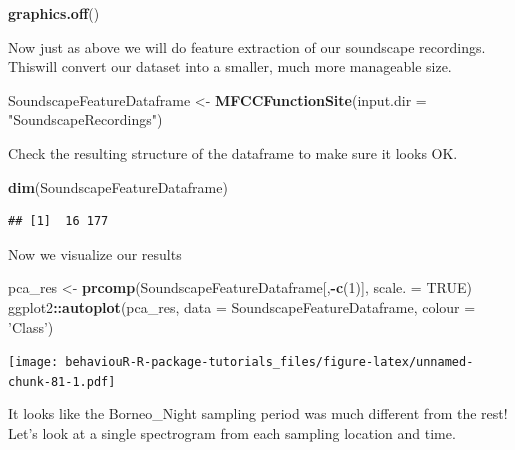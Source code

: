 \documentclass[]{book}
\newenvironment{Shaded}{\begin{snugshade}}{\end{snugshade}}
\newcommand{\DataTypeTok}[1]{\textcolor[rgb]{0.13,0.29,0.53}{#1}}
\newcommand{\DecValTok}[1]{\textcolor[rgb]{0.00,0.00,0.81}{#1}}
\newcommand{\KeywordTok}[1]{\textcolor[rgb]{0.13,0.29,0.53}{\textbf{#1}}}
\newcommand{\NormalTok}[1]{#1}
\newcommand{\OperatorTok}[1]{\textcolor[rgb]{0.81,0.36,0.00}{\textbf{#1}}}
\newcommand{\OtherTok}[1]{\textcolor[rgb]{0.56,0.35,0.01}{#1}}
\newcommand{\StringTok}[1]{\textcolor[rgb]{0.31,0.60,0.02}{#1}}
\begin{document}
\begin{Shaded}
\begin{Highlighting}[]
\KeywordTok{graphics.off}\NormalTok{()}
\end{Highlighting}
\end{Shaded}

Now just as above we will do feature extraction of our soundscape recordings. Thiswill convert our dataset into a smaller, much more manageable size.

\begin{Shaded}
\begin{Highlighting}[]
\NormalTok{SoundscapeFeatureDataframe <-}\StringTok{ }
\StringTok{  }\KeywordTok{MFCCFunctionSite}\NormalTok{(}\DataTypeTok{input.dir =} \StringTok{"SoundscapeRecordings"}\NormalTok{)}
\end{Highlighting}
\end{Shaded}

Check the resulting structure of the dataframe to make sure it looks OK.

\begin{Shaded}
\begin{Highlighting}[]
\KeywordTok{dim}\NormalTok{(SoundscapeFeatureDataframe)}
\end{Highlighting}
\end{Shaded}

\begin{verbatim}
## [1]  16 177
\end{verbatim}

Now we visualize our results

\begin{Shaded}
\begin{Highlighting}[]
\NormalTok{pca_res <-}\StringTok{ }\KeywordTok{prcomp}\NormalTok{(SoundscapeFeatureDataframe[,}\OperatorTok{-}\KeywordTok{c}\NormalTok{(}\DecValTok{1}\NormalTok{)], }\DataTypeTok{scale. =} \OtherTok{TRUE}\NormalTok{)}
\NormalTok{ggplot2}\OperatorTok{::}\KeywordTok{autoplot}\NormalTok{(pca_res, }\DataTypeTok{data =}\NormalTok{ SoundscapeFeatureDataframe, }
         \DataTypeTok{colour =} \StringTok{'Class'}\NormalTok{)}
\end{Highlighting}
\end{Shaded}

\texttt{[image: behaviouR-R-package-tutorials\_files/figure-latex/unnamed-chunk-81-1.pdf]}

It looks like the Borneo\_Night sampling period was much different from the rest! Let's look at a single spectrogram from each sampling location and time.
\end{document}

